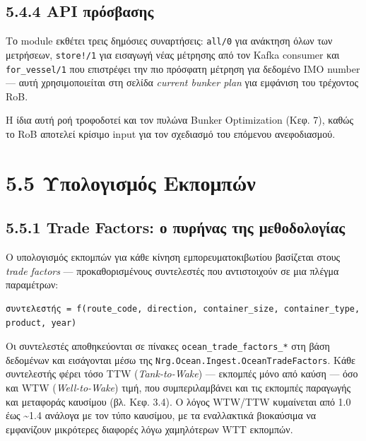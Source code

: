 \subsection{5.4.4 API
πρόσβασης}\label{api-ux3c0ux3c1ux3ccux3c3ux3b2ux3b1ux3c3ux3b7ux3c2}

Το module εκθέτει τρεις δημόσιες συναρτήσεις: \texttt{all/0} για
ανάκτηση όλων των μετρήσεων, \texttt{store!/1} για εισαγωγή νέας
μέτρησης από τον Kafka consumer και \texttt{for\_vessel/1} που
επιστρέφει την πιο πρόσφατη μέτρηση για δεδομένο IMO number --- αυτή
χρησιμοποιείται στη σελίδα \emph{current bunker plan} για εμφάνιση του
τρέχοντος RoB.

Η ίδια αυτή ροή τροφοδοτεί και τον πυλώνα Bunker Optimization (Κεφ. 7),
καθώς το RoB αποτελεί κρίσιμο input για τον σχεδιασμό του επόμενου
ανεφοδιασμού.

\section{5.5 Υπολογισμός
Εκπομπών}\label{ux3c5ux3c0ux3bfux3bbux3bfux3b3ux3b9ux3c3ux3bcux3ccux3c2-ux3b5ux3baux3c0ux3bfux3bcux3c0ux3ceux3bd}

\subsection{5.5.1 Trade Factors: ο πυρήνας της
μεθοδολογίας}\label{trade-factors-ux3bf-ux3c0ux3c5ux3c1ux3aeux3bdux3b1ux3c2-ux3c4ux3b7ux3c2-ux3bcux3b5ux3b8ux3bfux3b4ux3bfux3bbux3bfux3b3ux3afux3b1ux3c2}

Ο υπολογισμός εκπομπών για κάθε κίνηση εμπορευματοκιβωτίου βασίζεται
στους \emph{trade factors} --- προκαθορισμένους συντελεστές που
αντιστοιχούν σε μια πλέγμα παραμέτρων:

\begin{verbatim}
συντελεστής = f(route_code, direction, container_size, container_type, product, year)
\end{verbatim}

Οι συντελεστές αποθηκεύονται σε πίνακες
\texttt{ocean\_trade\_factors\_*} στη βάση δεδομένων και εισάγονται μέσω
της \texttt{Nrg.Ocean.Ingest.OceanTradeFactors}. Κάθε συντελεστής φέρει
τόσο TTW (\emph{Tank-to-Wake}) --- εκπομπές μόνο από καύση --- όσο και
WTW (\emph{Well-to-Wake}) τιμή, που συμπεριλαμβάνει και τις εκπομπές
παραγωγής και μεταφοράς καυσίμου (βλ. Κεφ. 3.4). Ο λόγος WTW/TTW
κυμαίνεται από 1.0 έως \textasciitilde1.4 ανάλογα με τον τύπο καυσίμου,
με τα εναλλακτικά βιοκαύσιμα να εμφανίζουν μικρότερες διαφορές λόγω
χαμηλότερων WTT εκπομπών.

